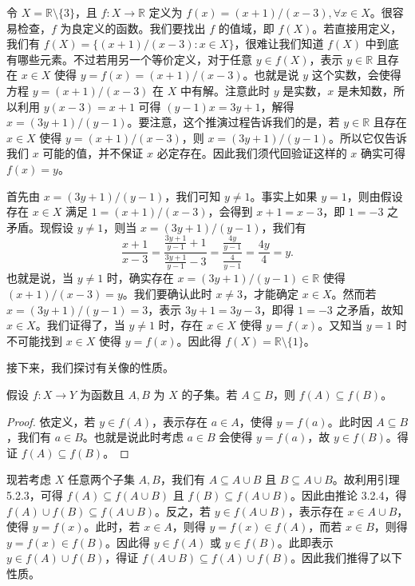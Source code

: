 \begin{example}
令 $X = \mathbb{R} \setminus \{3\}$，且 $f : X \to \mathbb{R}$ 定义为 $f(x) = (x + 1)/(x - 3), \forall x \in X$。很容易检查，$f$ 为良定义的函数。我们要找出 $f$ 的值域，即 $f(X)$。若直接用定义，我们有 $f(X) = \{(x + 1)/(x - 3) : x \in X\}$，很难让我们知道 $f(X)$ 中到底有哪些元素。不过若用另一个等价定义，对于任意 $y \in f(X)$，表示 $y \in \mathbb{R}$ 且存在 $x \in X$ 使得 $y = f(x) = (x + 1)/(x - 3)$。也就是说 $y$ 这个实数，会使得方程 $y = (x + 1)/(x - 3)$ 在 $X$ 中有解。注意此时 $y$ 是实数，$x$ 是未知数，所以利用 $y(x - 3) = x + 1$ 可得 $(y - 1)x = 3y + 1$，解得 $x = (3y + 1)/(y - 1)$。要注意，这个推演过程告诉我们的是，若 $y \in \mathbb{R}$ 且存在 $x \in X$ 使得 $y = (x + 1)/(x - 3)$，则 $x = (3y + 1)/(y - 1)$。所以它仅告诉我们 $x$ 可能的值，并不保证 $x$ 必定存在。因此我们须代回验证这样的 $x$ 确实可得 $f(x) = y$。

首先由 $x = (3y + 1)/(y - 1)$，我们可知 $y \neq 1$。事实上如果 $y = 1$，则由假设存在 $x \in X$ 满足 $1 = (x + 1)/(x - 3)$，会得到 $x + 1 = x - 3$，即 $1 = -3$ 之矛盾。现假设 $y \neq 1$，则当 $x = (3y + 1)/(y - 1)$，我们有
$$ \frac{x + 1}{x - 3} = \frac{\frac{3y+1}{y-1} + 1}{\frac{3y+1}{y-1} - 3} = \frac{\frac{4y}{y-1}}{\frac{4}{y-1}} = \frac{4y}{4} = y. $$
也就是说，当 $y \neq 1$ 时，确实存在 $x = (3y + 1)/(y - 1) \in \mathbb{R}$ 使得 $(x + 1)/(x - 3) = y$。我们要确认此时 $x \neq 3$，才能确定 $x \in X$。然而若 $x = (3y + 1)/(y - 1) = 3$，表示 $3y + 1 = 3y - 3$，即得 $1 = -3$ 之矛盾，故知 $x \in X$。我们证得了，当 $y \neq 1$ 时，存在 $x \in X$ 使得 $y = f(x)$。又知当 $y = 1$ 时不可能找到 $x \in X$ 使得 $y = f(x)$。因此得 $f(X) = \mathbb{R} \setminus \{1\}$。
\end{example}

接下来，我们探讨有关像的性质。

\begin{lemma}
假设 $f : X \to Y$ 为函数且 $A, B$ 为 $X$ 的子集。若 $A \subseteq B$，则 $f(A) \subseteq f(B)$。
\end{lemma}

\begin{proof}
依定义，若 $y \in f(A)$，表示存在 $a \in A$，使得 $y = f(a)$。此时因 $A \subseteq B$，我们有 $a \in B$。也就是说此时考虑 $a \in B$ 会使得 $y = f(a)$，故 $y \in f(B)$。得证 $f(A) \subseteq f(B)$。
\end{proof}

现若考虑 $X$ 任意两个子集 $A, B$，我们有 $A \subseteq A \cup B$ 且 $B \subseteq A \cup B$。故利用引理 5.2.3，可得 $f(A) \subseteq f(A \cup B)$ 且 $f(B) \subseteq f(A \cup B)$。因此由推论 3.2.4，得 $f(A) \cup f(B) \subseteq f(A \cup B)$。反之，若 $y \in f(A \cup B)$，表示存在 $x \in A \cup B$，使得 $y = f(x)$。此时，若 $x \in A$，则得 $y = f(x) \in f(A)$，而若 $x \in B$，则得 $y = f(x) \in f(B)$。因此得 $y \in f(A)$ 或 $y \in f(B)$。此即表示 $y \in f(A) \cup f(B)$，得证 $f(A \cup B) \subseteq f(A) \cup f(B)$。因此我们推得了以下性质。

